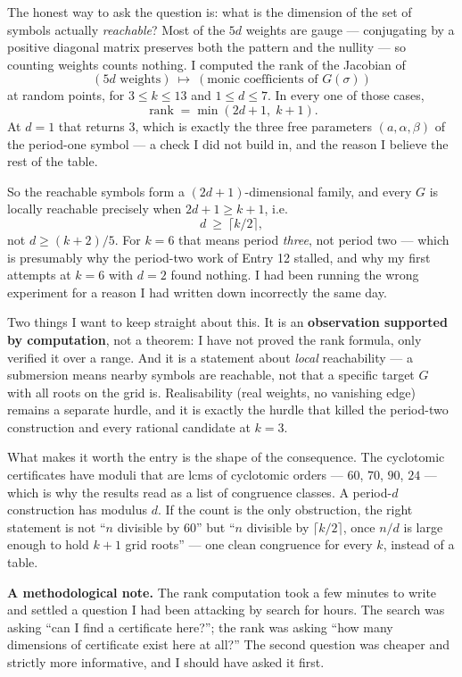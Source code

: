 \documentclass[12pt]{article}
\begin{document}
The honest way to ask the question is: what is the dimension of the set of
symbols actually \emph{reachable}? Most of the $5d$ weights are gauge ---
conjugating by a positive diagonal matrix preserves both the pattern and the
nullity --- so counting weights counts nothing. I computed the rank of the
Jacobian of
\[
  (\text{5$d$ weights})\ \longmapsto\ (\text{monic coefficients of } G(\sigma))
\]
at random points, for $3\le k\le13$ and $1\le d\le7$. In every one of those
cases,
\[
  \operatorname{rank}=\min(2d+1,\;k+1).
\]
At $d=1$ that returns $3$, which is exactly the three free parameters
$(a,\alpha,\beta)$ of the period-one symbol --- a check I did not build in, and
the reason I believe the rest of the table.

So the reachable symbols form a $(2d+1)$-dimensional family, and every $G$ is
locally reachable precisely when $2d+1\ge k+1$, i.e.
\[
  d\ \ge\ \lceil k/2\rceil ,
\]
not $d\ge(k+2)/5$. For $k=6$ that means period \emph{three}, not period two ---
which is presumably why the period-two work of Entry 12 stalled, and why my
first attempts at $k=6$ with $d=2$ found nothing. I had been running the wrong
experiment for a reason I had written down incorrectly the same day.

Two things I want to keep straight about this. It is an \textbf{observation
supported by computation}, not a theorem: I have not proved the rank formula,
only verified it over a range. And it is a statement about \emph{local}
reachability --- a submersion means nearby symbols are reachable, not that a
specific target $G$ with all roots on the grid is. Realisability (real weights,
no vanishing edge) remains a separate hurdle, and it is exactly the hurdle that
killed the period-two construction and every rational candidate at $k=3$.

What makes it worth the entry is the shape of the consequence. The cyclotomic
certificates have moduli that are lcms of cyclotomic orders --- $60$, $70$,
$90$, $24$ --- which is why the results read as a list of congruence classes. A
period-$d$ construction has modulus $d$. If the count is the only obstruction,
the right statement is not ``$n$ divisible by $60$'' but ``$n$ divisible by
$\lceil k/2\rceil$, once $n/d$ is large enough to hold $k+1$ grid roots'' ---
one clean congruence for every $k$, instead of a table.

\textbf{A methodological note.} The rank computation took a few minutes to
write and settled a question I had been attacking by search for hours. The
search was asking ``can I find a certificate here?''; the rank was asking ``how
many dimensions of certificate exist here at all?'' The second question was
cheaper and strictly more informative, and I should have asked it first.
\end{document}
